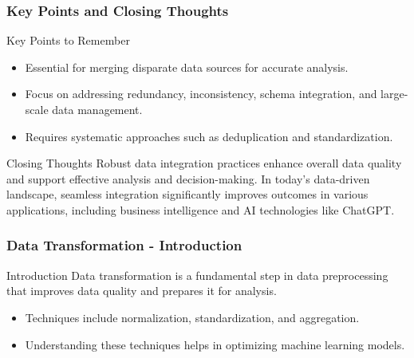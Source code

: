 \documentclass[aspectratio=169]{beamer}
\begin{document}
\begin{frame}[fragile]
    \frametitle{Key Points and Closing Thoughts}
    \begin{block}{Key Points to Remember}
        \begin{itemize}
            \item Essential for merging disparate data sources for accurate analysis.
            \item Focus on addressing redundancy, inconsistency, schema integration, and large-scale data management.
            \item Requires systematic approaches such as deduplication and standardization.
        \end{itemize}
    \end{block}
    \begin{block}{Closing Thoughts}
        Robust data integration practices enhance overall data quality and support effective analysis and decision-making. In today's data-driven landscape, seamless integration significantly improves outcomes in various applications, including business intelligence and AI technologies like ChatGPT.
    \end{block}
\end{frame}

\begin{frame}[fragile]
    \frametitle{Data Transformation - Introduction}
    \begin{block}{Introduction}
        Data transformation is a fundamental step in data preprocessing that improves data quality and prepares it for analysis. 
        \begin{itemize}
            \item Techniques include normalization, standardization, and aggregation.
            \item Understanding these techniques helps in optimizing machine learning models.
        \end{itemize}
    \end{block}
\end{frame}
\end{document}
